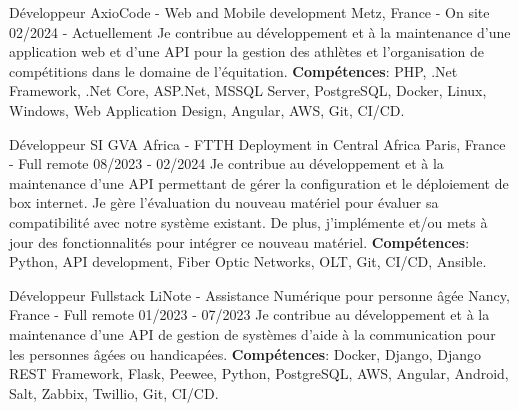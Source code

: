 

\begin{cventries}

  \cventry
    {Développeur} %
    {AxioCode - Web and Mobile development} %
    {Metz, France - On site} %
    {02/2024 - Actuellement} %
    {
      Je contribue au développement et à la maintenance d'une application web et d'une API pour la gestion des athlètes et l'organisation de compétitions dans le domaine de l'équitation.
      \newline
      \textbf{Compétences}: PHP, .Net Framework, .Net Core, ASP.Net, MSSQL Server, PostgreSQL, Docker, Linux, Windows, Web Application Design, Angular, AWS, Git, CI/CD.
    }

  \cventry
    {Développeur SI} %
    {GVA Africa - FTTH Deployment in Central Africa} %
    {Paris, France - Full remote} %
    {08/2023 - 02/2024} %
    {
      Je contribue au développement et à la maintenance d'une API permettant de gérer la configuration et le déploiement de box internet.
      \newline
      Je gère l'évaluation du nouveau matériel pour évaluer sa compatibilité avec notre système existant.
      \newline
      De plus, j'implémente et/ou mets à jour des fonctionnalités pour intégrer ce nouveau matériel.
      \textbf{Compétences}: Python, API development, Fiber Optic Networks, OLT, Git, CI/CD, Ansible.
    }

  \cventry
    {Développeur Fullstack} %
    {LiNote - Assistance Numérique pour personne âgée} %
    {Nancy, France - Full remote} %
    {01/2023 - 07/2023} %
    {
      Je contribue au développement et à la maintenance d'une API de gestion de systèmes d'aide à la communication pour les personnes âgées ou handicapées.
      \newline
      \textbf{Compétences}: Docker, Django, Django REST Framework, Flask, Peewee, Python, PostgreSQL, AWS, Angular, Android, Salt, Zabbix, Twillio, Git, CI/CD.
    }


\end{cventries}
